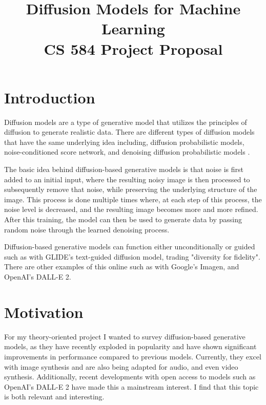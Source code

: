 \documentclass[conference]{IEEEtran}
\begin{document}
\title{%
Diffusion Models for Machine Learning \\
\huge CS 584 Project Proposal}

\author{
}

\maketitle

\section{Introduction}

Diffusion models are a type of generative model that utilizes the principles of diffusion to generate realistic data. There are different types of diffusion models
that have the same underlying idea including, diffusion probabilistic models, noise-conditioned score network,
and denoising diffusion probabilistic models \cite{weng2021diffusion}.

The basic idea behind diffusion-based generative models is that noise is first added to an initial input,
where the resulting noisy image is then processed to subsequently remove that noise, while preserving the underlying structure of the image.
This process is done multiple times where, at each step of this process, the noise level is decreased, and the resulting image becomes more and more refined. After this training, the model can then be used to generate data by passing random noise through the learned denoising process.

Diffusion-based generative models can function either unconditionally or guided such as with GLIDE's text-guided diffusion model, trading "diversity for fidelity"\cite{GLIDE}. There are other examples of this online such as with Google's Imagen, and OpenAI's DALL-E 2.

\section {Motivation}

For my theory-oriented project I wanted to survey diffusion-based generative models, as they have recently exploded in popularity
and have shown significant improvements in performance compared to previous models. Currently, they excel with image synthesis and are also being adapted for audio, and even video synthesis\cite{karras2022elucidating}\cite{pmlr-v162-nichol22a}.
Additionally, recent developments with open access to models such as OpenAI's DALL-E 2 have made this a mainstream interest. I find that this topic is both relevant and interesting.
\end{document}
